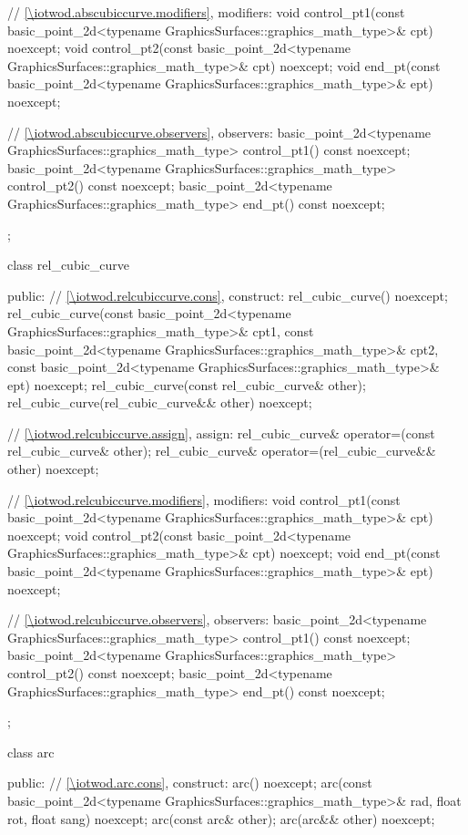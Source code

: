 \begin{codeblock}
{{{      // \ref{\iotwod.abscubiccurve.modifiers}, modifiers:
      void control_pt1(const basic_point_2d<typename
        GraphicsSurfaces::graphics_math_type>& cpt) noexcept;
      void control_pt2(const basic_point_2d<typename
        GraphicsSurfaces::graphics_math_type>& cpt) noexcept;
      void end_pt(const basic_point_2d<typename
        GraphicsSurfaces::graphics_math_type>& ept) noexcept;

      // \ref{\iotwod.abscubiccurve.observers}, observers:
      basic_point_2d<typename GraphicsSurfaces::graphics_math_type> control_pt1() const noexcept;
      basic_point_2d<typename GraphicsSurfaces::graphics_math_type> control_pt2() const noexcept;
      basic_point_2d<typename GraphicsSurfaces::graphics_math_type> end_pt() const noexcept;
    };

    class rel_cubic_curve {
    public:
      // \ref{\iotwod.relcubiccurve.cons}, construct:
      rel_cubic_curve() noexcept;
      rel_cubic_curve(const basic_point_2d<typename GraphicsSurfaces::graphics_math_type>& cpt1,
      const basic_point_2d<typename GraphicsSurfaces::graphics_math_type>& cpt2,
      const basic_point_2d<typename GraphicsSurfaces::graphics_math_type>& ept) noexcept;
      rel_cubic_curve(const rel_cubic_curve& other);
      rel_cubic_curve(rel_cubic_curve&& other) noexcept;

      // \ref{\iotwod.relcubiccurve.assign}, assign:
      rel_cubic_curve& operator=(const rel_cubic_curve& other);
      rel_cubic_curve& operator=(rel_cubic_curve&& other) noexcept;

      // \ref{\iotwod.relcubiccurve.modifiers}, modifiers:
      void control_pt1(const basic_point_2d<typename
        GraphicsSurfaces::graphics_math_type>& cpt) noexcept;
      void control_pt2(const basic_point_2d<typename
        GraphicsSurfaces::graphics_math_type>& cpt) noexcept;
      void end_pt(const basic_point_2d<typename
        GraphicsSurfaces::graphics_math_type>& ept) noexcept;

      // \ref{\iotwod.relcubiccurve.observers}, observers:
      basic_point_2d<typename GraphicsSurfaces::graphics_math_type> control_pt1() const noexcept;
      basic_point_2d<typename GraphicsSurfaces::graphics_math_type> control_pt2() const noexcept;
      basic_point_2d<typename GraphicsSurfaces::graphics_math_type> end_pt() const noexcept;
    };

    class arc {
    public:
      // \ref{\iotwod.arc.cons}, construct:
      arc() noexcept;
      arc(const basic_point_2d<typename GraphicsSurfaces::graphics_math_type>& rad, float rot, float sang) noexcept;
      arc(const arc& other);
      arc(arc&& other) noexcept;

}}}
\end{codeblock}
